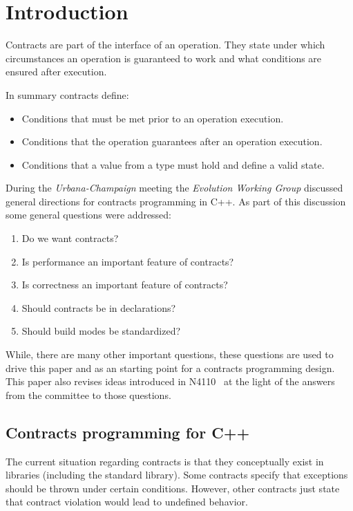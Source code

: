 \section{Introduction}

Contracts are part of the interface of an operation. They state under which
circumstances an operation is guaranteed to work and what conditions are
ensured after execution. 

In summary contracts define:

\begin{itemize}
\item Conditions that must be met prior to an operation execution.
\item Conditions that the operation guarantees after an operation execution.
\item Conditions that a value from a type must hold and define a valid state.
\end{itemize}

During the \emph{Urbana-Champaign} meeting the \emph{Evolution Working Group} discussed
general directions for contracts programming in C++. As part of this discussion
some general questions were addressed:

\begin{enumerate}
\item Do we want contracts?
\item Is performance an important feature of contracts?
\item Is correctness an important feature of contracts?
\item Should contracts be in declarations?
\item Should build modes be standardized?
\end{enumerate}

While, there are many other important questions, these questions are used to
drive this paper and as an starting point for a contracts programming design.
This paper also revises ideas introduced in N4110~\cite{n4110} at the light of
the answers from the committee to those questions.

\subsection{Contracts programming for C++}

The current situation regarding contracts is that they conceptually exist in
libraries (including the standard library). Some contracts specify that
exceptions should be thrown under certain conditions. However, other contracts
just state that contract violation would lead to undefined behavior.

